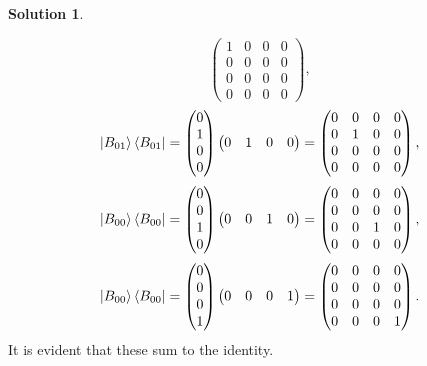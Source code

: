 \documentclass[10pt]{article}
\theoremstyle{definition}
\newtheorem{soln}{Solution}
\begin{document}
\begin{soln}
\begin{enumerate}[label=(\alph*)]
$$\begin{pmatrix}
              1 & 0 & 0 & 0 \\
              0 & 0 & 0 & 0 \\
              0 & 0 & 0 & 0 \\
              0 & 0 & 0 & 0
            \end{pmatrix},$$
          $$\ket{B_{01}}\bra{B_{01}}=\begin{pmatrix}
              0 \\1\\0\\0
            \end{pmatrix}\begin{pmatrix}
              0 & 1 & 0 & 0
            \end{pmatrix}=\begin{pmatrix}
              0 & 0 & 0 & 0 \\
              0 & 1 & 0 & 0 \\
              0 & 0 & 0 & 0 \\
              0 & 0 & 0 & 0
            \end{pmatrix},$$
          $$\ket{B_{00}}\bra{B_{00}}=\begin{pmatrix}
              0 \\0\\1\\0
            \end{pmatrix}\begin{pmatrix}
              0 & 0 & 1 & 0
            \end{pmatrix}=\begin{pmatrix}
              0 & 0 & 0 & 0 \\
              0 & 0 & 0 & 0 \\
              0 & 0 & 1 & 0 \\
              0 & 0 & 0 & 0
            \end{pmatrix},$$
          $$\ket{B_{00}}\bra{B_{00}}=\begin{pmatrix}
              0 \\0\\0\\1
            \end{pmatrix}\begin{pmatrix}
              0 & 0 & 0 & 1
            \end{pmatrix}=\begin{pmatrix}
              0 & 0 & 0 & 0 \\
              0 & 0 & 0 & 0 \\
              0 & 0 & 0 & 0 \\
              0 & 0 & 0 & 1
            \end{pmatrix}.$$
            It is evident that these sum to the identity.
  \end{enumerate}
\end{soln}
\end{document}

